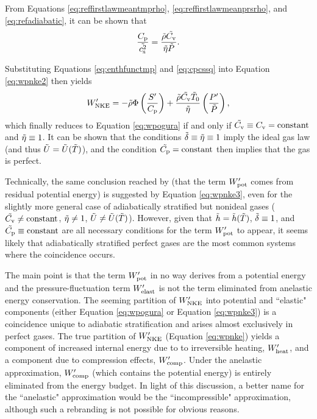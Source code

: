 \documentclass[12pt]{article}
\newcommand{\wpnke}{W^\prime_{\rm NKE}}
\newcommand{\wpheat}{W^\prime_{\rm heat}}
\newcommand{\wpcomp}{W^\prime_{\rm comp}}
\newcommand{\wppot}{W^\prime_{\rm pot}}
\newcommand{\wpelast}{W^\prime_{\rm elast}}
\begin{document}
From Equations \eqref{eq:reffirstlawmeantmprho}, \eqref{eq:reffirstlawmeanprsrho}, and \eqref{eq:refadiabatic}, it can be shown that
\begin{align}\label{eq:cpcssq}
	\frac{C_{\rm{p}}}{\tilde{c_{\rm s}^2}} = \frac{\tilde{\rho}\tilde{C_{\rm{v}}}}{\tilde{\eta}\tilde{P}}.
\end{align}

Substituting Equations \eqref{eq:enthfunctmp} and \eqref{eq:cpcssq} into Equation \eqref{eq:wpnke2} then yields
\begin{align}\label{eq:wpnke3}
	\wpnke =-\rhotilde\Phi\left(\frac{\entrprime}{\cpcap}\right) + \frac{\rhotilde\cvtilde\tmptilde_0}{\etatilde}\left(\frac{\prsprime}{\prstilde}\right),
\end{align}
which finally reduces to Equation \eqref{eq:wpogura} if and only if $\tilde{C_{\rm{v}}}\equiv C_{\rm{v}}=\text{constant}$ and $\tilde{\eta}\equiv1$. It can be shown that the conditions $\tilde{\delta}\equiv\tilde{\eta}\equiv1$ imply the ideal gas law (and thus $\tilde{U}=\tilde{U}(\tilde{T})$), and the condition $\tilde{C_{\rm{p}}}=\text{constant}$ then implies that the gas is perfect.

Technically, the same conclusion reached by \citet{Ogura1962} (that the term $\wppot$ comes from residual potential energy) is suggested by Equation \eqref{eq:wpnke3}, even for the slightly more general case of adiabatically stratified but nonideal gases ($\tilde{C_{\rm{v}}}\neq\text{constant}$, $\tilde{\eta}\neq1$, $\tilde{U}\neq\tilde{U}(\tilde{T})$). However, given that $\tilde{h}=\tilde{h}(\tilde{T})$, $\tilde{\delta}\equiv1$, and $\tilde{C_{\rm{p}}}\equiv\text{constant}$ are all necessary conditions for the term $\wppot$ to appear, it seems likely that adiabatically stratified perfect gases are the most common systems where the coincidence occurs. 

The main point is that the term $\wppot$ in no way derives from a potential energy and the pressure-fluctuation term $\wpelast$ is not the term eliminated from anelastic energy conservation. The seeming partition of $\wpnke$ into potential and ``elastic" components (either Equation \eqref{eq:wpogura} or Equation \eqref{eq:wpnke3}) is a coincidence unique to adiabatic stratification and arises almost exclusively in perfect gases. The true partition of $\wpnke$ (Equation \eqref{eq:wpnke}) yields a component of increased internal energy due to to irreversible heating, $\wpheat$, and a component due to compression effects, $\wpcomp$. Under the anelastic approximation, $\wpcomp$ (which contains the potential energy) is entirely eliminated from the energy budget. In light of this discussion, a better name for the ``anelastic" approximation would be the ``incompressible" approximation, although such a rebranding is not possible for obvious reasons. 
\end{document}
